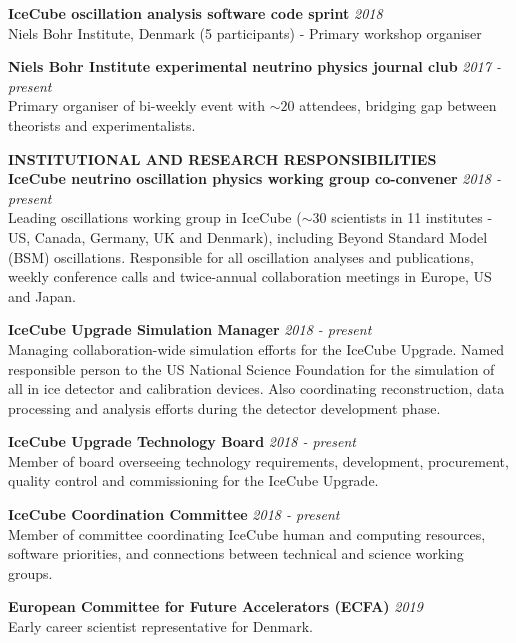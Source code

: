 \documentclass[a4paper,11pt]{article}
\renewcommand{\smallskip} {\vspace{0.1in}}
\begin{document}
{\bf IceCube oscillation analysis software code sprint} \hfill {\em 2018} \\ 
  Niels Bohr Institute, Denmark (5 participants) - Primary workshop organiser

{\bf Niels Bohr Institute experimental neutrino physics journal club} \hfill {\em 2017 - present} \\ 
Primary organiser of bi-weekly event with $\sim20$ attendees, bridging gap between theorists and experimentalists.

  
\vspace{0.2cm}
\textbf{INSTITUTIONAL AND RESEARCH RESPONSIBILITIES ~~\hrulefill}\smallskip\\
%
{\bf IceCube neutrino oscillation physics working group co-convener} \hfill {\em 2018 - present} \\ 
Leading oscillations working group in IceCube ($\sim$30 scientists in 11 institutes - US, Canada, Germany, UK and Denmark), including Beyond Standard Model (BSM) oscillations. Responsible for all oscillation analyses and publications, weekly conference calls and twice-annual collaboration meetings in Europe, US and Japan. 

{\bf IceCube Upgrade Simulation Manager} \hfill {\em 2018 - present} \\ 
Managing collaboration-wide simulation efforts for the IceCube Upgrade. Named responsible person to the US National Science Foundation for the simulation of all in ice detector and calibration devices. Also coordinating reconstruction, data processing and analysis efforts during the detector development phase.

{\bf IceCube Upgrade Technology Board} \hfill {\em 2018 - present} \\ 
Member of board overseeing technology requirements, development, procurement, quality control and commissioning for the IceCube Upgrade.

{\bf IceCube Coordination Committee} \hfill {\em 2018 - present} \\ 
Member of committee coordinating IceCube human and computing resources, software priorities, and connections between technical and science working groups.

{\bf European Committee for Future Accelerators (ECFA) } \hfill {\em 2019} \\ 
Early career scientist representative for Denmark.
\end{document}
